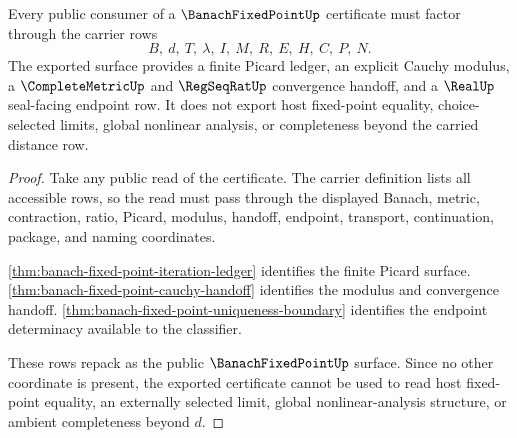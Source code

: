 \begin{theorem}
\label{thm:banach-fixed-point-public-export}
Every public consumer of a $\BanachFixedPointUp$ certificate must factor through the carrier rows
$$
B,\ d,\ T,\ \lambda,\ I,\ M,\ R,\ E,\ H,\ C,\ P,\ N.
$$
The exported surface provides a finite Picard ledger, an explicit Cauchy modulus, a $\CompleteMetricUp$ and $\RegSeqRatUp$ convergence handoff, and a $\RealUp$ seal-facing endpoint row. It does not export host fixed-point equality, choice-selected limits, global nonlinear analysis, or completeness beyond the carried distance row.
\end{theorem}
\begin{proof}
Take any public read of the certificate. The carrier definition lists all accessible rows, so the read must pass through the displayed Banach, metric, contraction, ratio, Picard, modulus, handoff, endpoint, transport, continuation, package, and naming coordinates.

\autoref{thm:banach-fixed-point-iteration-ledger} identifies the finite Picard surface. \autoref{thm:banach-fixed-point-cauchy-handoff} identifies the modulus and convergence handoff. \autoref{thm:banach-fixed-point-uniqueness-boundary} identifies the endpoint determinacy available to the classifier.

These rows repack as the public $\BanachFixedPointUp$ surface. Since no other coordinate is present, the exported certificate cannot be used to read host fixed-point equality, an externally selected limit, global nonlinear-analysis structure, or ambient completeness beyond $d$.
\end{proof}

